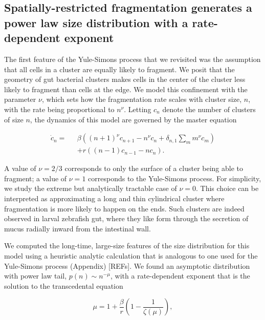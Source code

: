 \documentclass[aps,pre,twocolumn]{revtex4-1}
\def\be{\begin{equation}}
\def\ee{\end{equation}}
\begin{document}
 
 




\subsection{Spatially-restricted fragmentation generates a power law size distribution with a rate-dependent exponent}
The first feature of the Yule-Simons process that we revisited was the assumption that all cells in a cluster are equally likely to fragment. We posit that the geometry of gut bacterial clusters makes cells in the center of the cluster less likely to fragment than cells at the edge. We model this confinement with the parameter $\nu$, which sets how the fragmentation rate scales with cluster size, $n$, with the rate being proportional to $n^{\nu}$. Letting $c_n$ denote the number of clusters of size $n$, the dynamics of this model are governed by the master equation 



	\begin{align}
	\dot{c}_n = \text{ }&\beta\left((n+1)^{\nu}c_{n+1}- n^{\nu}c_n + \delta_{n,1}\sum_m m^{\nu}c_m\right)\nonumber\\[6pt]
	&+r\left((n-1)c_{n-1} - nc_n\right). 
	\end{align}

A value of $\nu = 2/3$ corresponds to only the surface of a cluster being able to fragment; a value of $\nu=1$ corresponds to the Yule-Simons process. For simplicity, we study the extreme but analytically tractable case of $\nu=0$. This choice can be interpreted as approximating a long and thin cylindrical cluster where fragmentation is more likely to happen on the ends. Such clusters are indeed observed in larval zebrafish gut, where they like form through the secretion of mucus radially inward from the intestinal wall. 
 
We computed the long-time, large-size features of the size distribution for this model using a heuristic analytic calculation that is analogous to one used for the Yule-Simons process (Appendix) [REFs]. We found an asymptotic distribution with power law tail, $p(n)\sim n^{-\mu}$, with a rate-dependent exponent that is the solution to the transcedental equation
 
\be
\mu = 1 + \frac{\beta}{r}\left(1-\frac{1}{\zeta(\mu)}\right),
\ee
\end{document}
